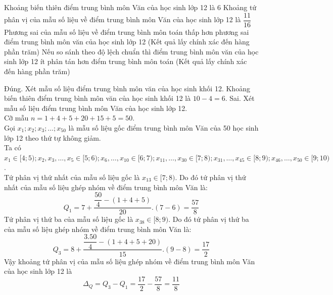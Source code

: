 \begin{ex}
\begin{center}
	\end{center}
	\choiceTF
	{\True Khoảng biến thiên điểm trung bình môn Văn của học sinh lớp 12 là $6$}
	{Khoảng tứ phân vị của mẫu số liệu về điểm trung bình môn Văn của học sinh lớp 12 là $\dfrac{11}{16}$}
	{\True Phương sai của mẫu số liệu về điểm trung bình môn toán thấp hơn phương sai điểm trung bình môn văn của học sinh lớp 12 (Kết quả lấy chính xác đến hàng phần trăm)}
	{Nếu so sánh theo độ lệch chuẩn thì điểm trung bình môn văn của học sinh lớp 12 ít phân tán hơn điểm trung bình môn toán (Kết quả lấy chính xác đến hàng phần trăm)}
	\loigiai
	{
		\begin{itemchoice}
			\itemch Đúng. Xét mẫu số liệu điểm trung bình môn văn của học sinh khối 12. Khoảng biến thiên điểm trung bình môn văn của học sinh khối 12 là $10-4=6$.
			\itemch Sai. Xét mẫu số liệu điểm trung bình môn Văn của học sinh lớp 12.\\
			Cỡ mẫu ${n}=1+4+5+20+15+5=50$.\\
			Gọi ${x}_{1} ; {x}_{2} ; {x}_{3} ; \ldots ; {x}_{50}$ là mẫu số liệu gốc điểm trung bình môn Văn của 50 học sinh lớp 12 theo thứ tự không giảm.\\
			Ta có
			${x}_{1} \in[4 ; 5) ; {x}_{2}, {x}_{3}, \ldots, {x}_{5} \in[5 ; 6) ; {x}_{6}, \ldots, {x}_{10} \in[6 ; 7) ; {x}_{11}, \ldots, {x}_{30} \in[7 ; 8) ; {x}_{31}, \ldots, {x}_{45} \in[8 ; 9) ; {x}_{46}, \ldots, {x}_{50} \in[9 ; 10)$.\\
			Tứ phân vị thứ nhất của mẫu số liệu gốc là $x_{13} \in[7 ; 8)$. Do đó tứ phân vị thứ nhất của mẫu số liệu ghép nhóm về điểm trung bình môn Văn là:
			$${Q}_{1}=7+\dfrac{\dfrac{50}{4}-(1+4+5)}{20} .(7-6)=\dfrac{57}{8}$$
			Tứ phân vị thứ ba của mẫu số liệu gốc là $x_{38} \in[8 ; 9)$. Do đó tứ phân vị thứ ba của mẫu số liệu ghép nhóm về điểm trung bình môn Văn là:
			$${Q}_{3}=8+\dfrac{\dfrac{3.50}{4}-(1+4+5+20)}{15} .(9-8)=\dfrac{17}{2}$$
			Vậy khoảng tứ phân vị của mẫu số liệu ghép nhóm về điểm trung bình môn Văn của học sinh lớp 12 là 
			$$ \Delta_{Q}={Q}_{3}-{Q}_{1}=\dfrac{17}{2}-\dfrac{57}{8}=\dfrac{11}{8}$$

\end{itemchoice}}
\end{ex}
